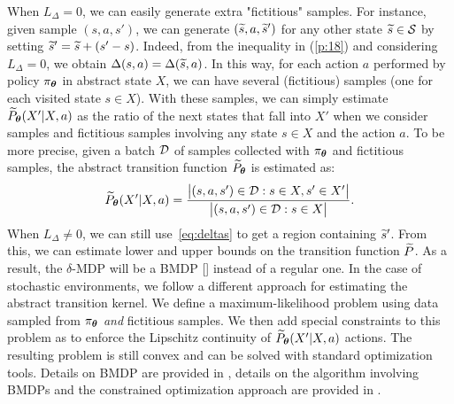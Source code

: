 %
When $L_{\Delta}=0$, we can easily generate extra "fictitious" samples. For instance, given sample $(s,a,s')$, we can generate $(\widetilde{s},a,\widetilde{s}')$ for any other state $\widetilde{s}\in\mathcal{S}$ by setting $\widetilde{s}' = \widetilde{s} + (s'-s)$. Indeed, from the inequality in (\ref{p:18}) and considering $L_{\Delta}=0$, we obtain $\Delta(s,a)=\Delta(\widetilde{s},a)$. In this way, for each action $a$ performed by policy $\pi_{\boldsymbol{\theta}}$ in abstract state $X$, we can have several (fictitious) samples (one for each visited state $s\in X$). With these samples, we can simply estimate $\widetilde{P}_{\boldsymbol{\theta}}(X'|X,a)$ as the ratio of the next states that fall into $X'$ when we consider samples and fictitious samples involving any state $s \in X$ and the action $a$. To be more precise, given a batch $\mathcal{D}$ of samples collected with $\pi_{\boldsymbol{\theta}}$ and fictitious samples, the abstract transition function $\widetilde{P}_{\boldsymbol{\theta}}$ is estimated as:
\begin{align}
	\widetilde{P}_{\boldsymbol{\theta}}(X'|X,a) = \frac{\big|(s,a,s') \in \mathcal{D}: s \in X, s' \in X'\big|}{\big|(s,a,s') \in \mathcal{D}: s \in X\big|}.
\end{align}
When $L_{\Delta}\neq 0$, we can still use~\eqref{eq:deltas} to get a region containing $\widetilde{s}'$.
From this, we can estimate lower and upper bounds on the transition function $\widetilde{P}$. As a result, the $\delta$-\ac{MDP} will be a \ac{BMDP} [\cite{givan2000bounded}] instead of a regular one.
%
In the case of stochastic environments, we follow a different approach for estimating the abstract transition kernel. We define a maximum-likelihood problem using data sampled from $\pi_{\boldsymbol{\theta}}$ \textit{and} fictitious samples. We then add special constraints to this problem as to enforce the Lipschitz continuity of $\widetilde{P}_{\boldsymbol{\theta}}(X'|X,a)$ \wrt actions. The resulting problem is still convex and can be solved with standard optimization tools.
Details on \ac{BMDP} are provided in , details on the algorithm involving \ac{BMDP}s and the constrained optimization approach are provided in . 

